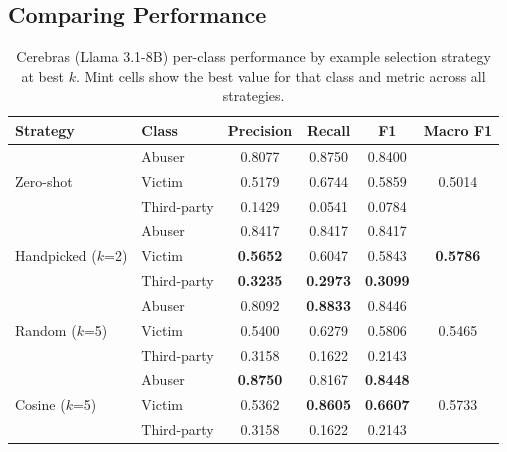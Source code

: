 \documentclass[12pt]{article}
\begin{document}
\subsection{Comparing Performance}

\begin{table}[H]
    \centering
    \renewcommand{\arraystretch}{1.4}
    \begin{tabular}{l l c c c c}
        \toprule
        \rowcolor{llmheader}
        \color{white}\textbf{Strategy} & \color{white}\textbf{Class} & \color{white}\textbf{Precision} & \color{white}\textbf{Recall} & \color{white}\textbf{F1} & \color{white}\textbf{Macro F1} \\
        \midrule
        \multirow{3}{*}{Zero-shot}
            & Abuser      & 0.8077 & 0.8750 & 0.8400 & \multirow{3}{*}{0.5014} \\
            & Victim      & 0.5179 & 0.6744 & 0.5859 & \\
            & Third-party & 0.1429 & 0.0541 & 0.0784 & \\
        \cmidrule{1-6}
        \multirow{3}{*}{Handpicked ($k$=2)}
            & Abuser      & 0.8417 & 0.8417 & 0.8417 & \multirow{3}{*}{\textbf{0.5786}} \\
            & Victim      & \cellcolor{llmhighlight}\textbf{0.5652} & 0.6047 & 0.5843 & \\
            & Third-party & \cellcolor{llmhighlight}\textbf{0.3235} & \cellcolor{llmhighlight}\textbf{0.2973} & \cellcolor{llmhighlight}\textbf{0.3099} & \\
        \cmidrule{1-6}
        \multirow{3}{*}{Random ($k$=5)}
            & Abuser      & 0.8092 & \cellcolor{llmhighlight}\textbf{0.8833} & 0.8446 & \multirow{3}{*}{0.5465} \\
            & Victim      & 0.5400 & 0.6279 & 0.5806 & \\
            & Third-party & 0.3158 & 0.1622 & 0.2143 & \\
        \cmidrule{1-6}
        \multirow{3}{*}{Cosine ($k$=5)}
            & Abuser      & \cellcolor{llmhighlight}\textbf{0.8750} & 0.8167 & \cellcolor{llmhighlight}\textbf{0.8448} & \multirow{3}{*}{0.5733} \\
            & Victim      & 0.5362 & \cellcolor{llmhighlight}\textbf{0.8605} & \cellcolor{llmhighlight}\textbf{0.6607} & \\
            & Third-party & 0.3158 & 0.1622 & 0.2143 & \\
        \bottomrule
    \end{tabular}
    \caption{Cerebras (Llama 3.1-8B) per-class performance by example selection strategy
    at best $k$. Mint cells show the best value for that class and metric across all strategies.}
    \label{tab:Cerebras-strategy}
\end{table}
\end{document}
